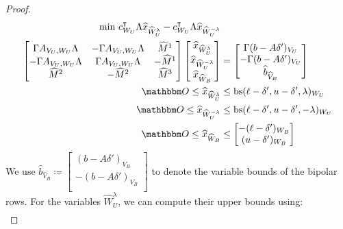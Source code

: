 \documentclass[pdflatex,sn-mathphys-num]{sn-jnl}%
\theoremstyle{thmstyleone}%
\theoremstyle{thmstylethree}%
\theoremstyle{thmstyletwo}%
\begin{document}
\begin{proof}
\begin{subequations}
\label{lp_centered_extended_reordered_delta}
\begin{align}
    \min\, \transpose{c_{W_U}} \Lambda \widehat{x}_{\widehat{W}^\lambda_U} - \transpose{c_{W_U}} \Lambda \widehat{x}_{\widehat{W}^{-\lambda}_U} & \\
\begin{bmatrix}
    \Gamma A_{V_U,W_U} \Lambda & -\Gamma A_{V_U,W_U} \Lambda & \widehat{M}^1
    \\
    -\Gamma A_{V_U,W_U} \Lambda & \Gamma A_{V_U,W_U} \Lambda & -\widehat{M}^1
    \\
    \widehat{M}^2 & -\widehat{M}^2 & \widehat{M}^3 \\
\end{bmatrix}
\begin{bmatrix}
    \widehat{x}_{\widehat{W}^\lambda_U}\\
    \widehat{x}_{\widehat{W}^{-\lambda}_U}\\
    \widehat{x}_{\widehat{W}_B}
\end{bmatrix} &= \begin{bmatrix}
    \Gamma (b - A \delta')_{V_U}\\
    -\Gamma (b- A \delta')_{V_U}\\
    \widehat{b}_{\widehat{V}_B}
\end{bmatrix}
\label{lp_centered_extended_reordered_delta_eqs}
\\
\zerovec \leq \widehat{x}_{\widehat{W}^\lambda_U} &\leq \mathrm{bs}(\ell-\delta',u-\delta',\lambda)_{W_U} \\
\zerovec \leq \widehat{x}_{\widehat{W}^{-\lambda}_U} &\leq \mathrm{bs}(\ell-\delta',u-\delta',-\lambda)_{W_U} \\
\zerovec \leq \widehat{x}_{\widehat{W}_B} &\leq \begin{bmatrix}
    -(\ell-\delta')_{W_B}\\
    (u-\delta')_{W_B}
\end{bmatrix} 
\end{align}    
\end{subequations}
We use $\widehat{b}_{\widehat{V}_B} \coloneqq \begin{bmatrix}
    (b - A \delta')_{V_B}\\
    -(b - A \delta')_{V_B}\\
\end{bmatrix}$ to denote the variable bounds of the bipolar rows.
For the variables $\widehat{W}^{\lambda}_U$, we can compute their upper bounds using:
    \begin{align*}

\end{align*}
\end{proof}
\end{document}

